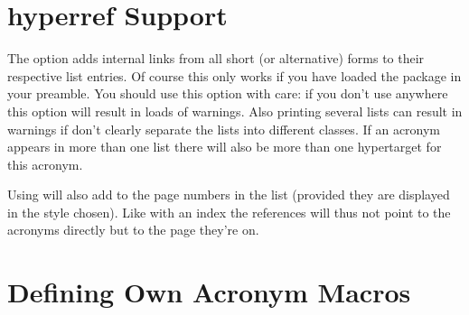 \documentclass[load-preamble+]{cnltx-doc}
\begin{document}
\begin{sourcecode}
\end{sourcecode}

\section{hyperref Support}
The option  adds internal links from all short (or
alternative) forms to their respective list entries.  Of course this only
works if you have loaded the  package in your preamble.  You
should use this option with care: if you don't use  anywhere
this option will result in loads of  warnings.  Also printing
several lists can result in warnings if don't clearly separate the lists into
different classes.  If an acronym appears in more than one list there will
also be more than one hypertarget for this acronym.

Using  will also add  to the page numbers in the
list (provided they are displayed in the style chosen).  Like with an index
the references will thus not point to the acronyms directly but to the page
they're on.

\section{Defining Own Acronym Macros}\label{sec:defining-own-acronym}
\end{document}
